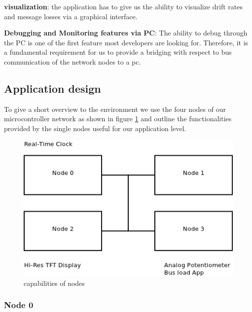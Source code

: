 \begin{req}
\label{req:app:visualization}
\textbf{visualization}: the application has to give us the ability to visualize drift rates and message losses via a graphical interface.
\end{req}

\begin{req}
\label{req:app:debug_and_monitor}
\textbf{Debugging and Monitoring features via PC}: The ability to debug through the PC is one of the first feature most developers are looking for. Therefore, it is a fundamental requirement for us to provide a bridging with respect to bus communication of the network nodes to a pc.
\end{req}


\subsection{Application design}
\label{sec:app:specification:design}

To give a short overview to the environment we use the four nodes of our microcontroller network as shown in figure \ref{fig:app:specification:node_overview}  
and outline the functionalities provided by the single nodes useful for our application level.\\

\begin{figure}[h]
 \centering
 \includegraphics[scale=0.5]{../images/node_overview.png}
 \caption{capabilities of nodes}
 \label{fig:app:specification:node_overview}
\end{figure}

\subsubsection{Node 0}
\label{sec:app:specification:node0}


